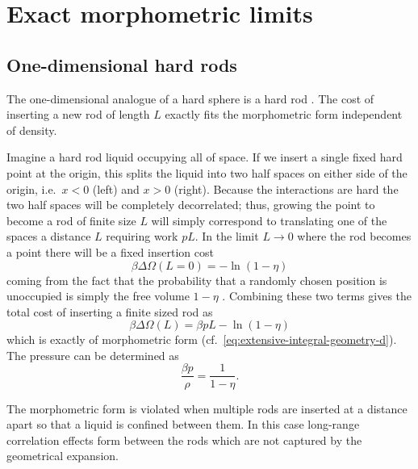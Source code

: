\documentclass[11pt,twoside]{report}
\begin{document}
\section{Exact morphometric limits}

\subsection{One-dimensional hard rods}
\label{sec:hard-rods}

The one-dimensional analogue of a hard sphere is a hard rod%
.
The cost of inserting a new rod of length $L$ exactly fits the morphometric form independent of density.

Imagine a hard rod liquid occupying all of space.
If we insert a single fixed hard point at the origin, this splits the liquid into two half spaces on either side of the origin, i.e.\ $x < 0$ (left) and $x > 0$ (right).
Because the interactions are hard the two half spaces will be completely decorrelated; thus, growing the point to become a rod of finite size $L$ will simply correspond to translating one of the spaces a distance $L$ requiring work $p L$.
In the limit $L \to 0$ where the rod becomes a point there will be a fixed insertion cost
\begin{equation*}
  \beta \Delta \Omega(L=0) = -\ln{(1-\eta)}
\end{equation*}
coming from the fact that the probability that a randomly chosen position is unoccupied is simply the free volume $1-\eta$ \cite{ReissJCP1959}.
Combining these two terms gives the total cost of inserting a finite sized rod as
\begin{equation}\label{eq:hard-rods-morphometric}
  \beta \Delta \Omega(L) = \beta p L - \ln{(1-\eta)}
\end{equation}
which is exactly of morphometric form (cf.\ \eqref{eq:extensive-integral-geometry-d}).
The pressure can be determined as \cite{TonksPR1936}
\begin{equation}\label{eq:hard-rods-eos}
  \frac{\beta p}{\rho} = \frac{1}{1 - \eta}.
\end{equation}

The morphometric form is violated when multiple rods are inserted at a distance apart so that a liquid is confined between them.
In this case long-range correlation effects form between the rods which are not captured by the geometrical expansion.
\end{document}
